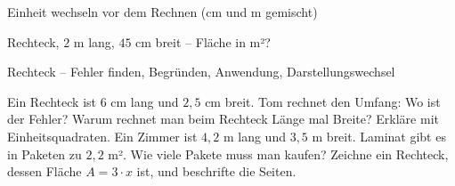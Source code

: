 \begin{aufgabe}{Einheit wechseln vor dem Rechnen (cm und m gemischt)}
\begin{teile}
\teil Rechteck, $2$ m lang, $45$ cm breit – Fläche in m²? \leerfeld[m²]
\end{teile}
\end{aufgabe}

\begin{aufgabe}{Rechteck – Fehler finden, Begründen, Anwendung, Darstellungswechsel}
\begin{teile}
\teil Ein Rechteck ist $6$ cm lang und $2{,}5$ cm breit. Tom rechnet den Umfang:  Wo ist der Fehler?
\teil Warum rechnet man beim Rechteck Länge mal Breite? Erkläre mit Einheitsquadraten.
\teil Ein Zimmer ist $4{,}2$ m lang und $3{,}5$ m breit. Laminat gibt es in Paketen zu $2{,}2$ m². Wie viele Pakete muss man kaufen?
\teil Zeichne ein Rechteck, dessen Fläche $A = 3 \cdot x$ ist, und beschrifte die Seiten.

\end{teile}
\end{aufgabe}
